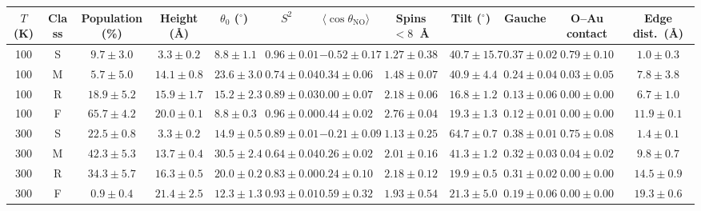 \begin{tabular}{cccccccccccc}
\toprule
$T$ (K) & Class & Population (\%) & Height (\AA) & $\theta_0$ ($^\circ$) & $S^2$ & $\langle\cos\theta_\mathrm{NO}\rangle$ & Spins $<8$~\AA & Tilt ($^\circ$) & Gauche & O--Au contact & Edge dist.\ (\AA)\\
\midrule
100 & S & $9.7\pm3.0$ & $3.3\pm0.2$ & $8.8\pm1.1$ & $0.96\pm0.01$ & $-0.52\pm0.17$ & $1.27\pm0.38$ & $40.7\pm15.7$ & $0.37\pm0.02$ & $0.79\pm0.10$ & $1.0\pm0.3$\\
100 & M & $5.7\pm5.0$ & $14.1\pm0.8$ & $23.6\pm3.0$ & $0.74\pm0.04$ & $0.34\pm0.06$ & $1.48\pm0.07$ & $40.9\pm4.4$ & $0.24\pm0.04$ & $0.03\pm0.05$ & $7.8\pm3.8$\\
100 & R & $18.9\pm5.2$ & $15.9\pm1.7$ & $15.2\pm2.3$ & $0.89\pm0.03$ & $0.00\pm0.07$ & $2.18\pm0.06$ & $16.8\pm1.2$ & $0.13\pm0.06$ & $0.00\pm0.00$ & $6.7\pm1.0$\\
100 & F & $65.7\pm4.2$ & $20.0\pm0.1$ & $8.8\pm0.3$ & $0.96\pm0.00$ & $0.44\pm0.02$ & $2.76\pm0.04$ & $19.3\pm1.3$ & $0.12\pm0.01$ & $0.00\pm0.00$ & $11.9\pm0.1$\\
\midrule
300 & S & $22.5\pm0.8$ & $3.3\pm0.2$ & $14.9\pm0.5$ & $0.89\pm0.01$ & $-0.21\pm0.09$ & $1.13\pm0.25$ & $64.7\pm0.7$ & $0.38\pm0.01$ & $0.75\pm0.08$ & $1.4\pm0.1$\\
300 & M & $42.3\pm5.3$ & $13.7\pm0.4$ & $30.5\pm2.4$ & $0.64\pm0.04$ & $0.26\pm0.02$ & $2.01\pm0.16$ & $41.3\pm1.2$ & $0.32\pm0.03$ & $0.04\pm0.02$ & $9.8\pm0.7$\\
300 & R & $34.3\pm5.7$ & $16.3\pm0.5$ & $20.0\pm0.2$ & $0.83\pm0.00$ & $0.24\pm0.10$ & $2.18\pm0.12$ & $19.9\pm0.5$ & $0.31\pm0.02$ & $0.00\pm0.00$ & $14.5\pm0.9$\\
300 & F & $0.9\pm0.4$ & $21.4\pm2.5$ & $12.3\pm1.3$ & $0.93\pm0.01$ & $0.59\pm0.32$ & $1.93\pm0.54$ & $21.3\pm5.0$ & $0.19\pm0.06$ & $0.00\pm0.00$ & $19.3\pm0.6$\\
\bottomrule
\end{tabular}
